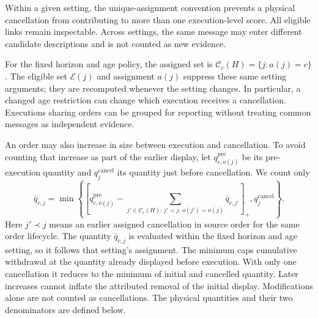 Within a given setting, the unique-assignment convention prevents a physical cancellation from contributing to more than one execution-level score. All eligible links remain inspectable. Across settings, the same message may enter different candidate descriptions and is not counted as new evidence.

For the fixed horizon and age policy, the assigned set is $\mathcal C_c(H)=\{j:a(j)=c\}$. The eligible set $\mathcal E(j)$ and assignment $a(j)$ suppress these same setting arguments; they are recomputed whenever the setting changes. In particular, a changed age restriction can change which execution receives a cancellation. Executions sharing orders can be grouped for reporting without treating common messages as independent evidence.

An order may also increase in size between execution and cancellation. To avoid counting that increase as part of the earlier display, let $q^{\mathrm{pre}}_{c,o(j)}$ be its pre-execution quantity and $q_j^{\mathrm{cancel}}$ its quantity just before cancellation. We count only
\begin{equation}
    \bar q_{c,j}
    =
    \min\!\left\{\left[q^{\mathrm{pre}}_{c,o(j)}-
        \sum_{j'\in\mathcal C_c(H):\,j'\prec j,\,o(j')=o(j)}\bar q_{c,j'}\right]_+,
        q^{\mathrm{cancel}}_j\right\}.
    \label{eq:attributed_cancel_quantity}
\end{equation}
Here $j'\prec j$ means an earlier assigned cancellation in source order for the same order lifecycle. The quantity $\bar q_{c,j}$ is evaluated within the fixed horizon and age setting, so it follows that setting's assignment. The minimum caps cumulative withdrawal at the quantity already displayed before execution. With only one cancellation it reduces to the minimum of initial and cancelled quantity. Later increases cannot inflate the attributed removal of the initial display. Modifications alone are not counted as cancellations. The physical quantities and their two denominators are defined below.


